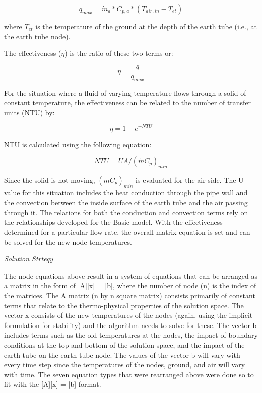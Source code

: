 \begin{equation}
q_{max} = \dot m_a * C_{p,a} * (T_{air,in} - T_{et})
\end{equation}

where \(T_{et}\) is the temperature of the ground at the depth of the earth tube (i.e., at the earth tube node).

The effectiveness (\(\eta\)) is the ratio of these two terms or:

\begin{equation}
\eta = \frac{q}{q_{max}}
\end{equation}

For the situation where a fluid of varying temperature flows through a solid of constant temperature, the effectiveness can be related to the number of transfer units (NTU) by:

\begin{equation}
\eta = 1 - e^{-NTU}
\end{equation}

NTU is calculated using the following equation:

\begin{equation}
NTU = U A / (\dot m C_p)_{min}
\end{equation}

Since the solid is not moving, \((\dot m C_p)_{min}\) is evaluated for the air side.  The U-value for this situation includes the heat conduction through the pipe wall and the convection between the inside surface of the earth tube and the air passing through it.  The relations for both the conduction and convection terms rely on the relationships developed for the Basic model.  With the effectiveness determined for a particular flow rate, the overall matrix equation is set and can be solved for the new node temperatures.

\emph{\textit{Solution Strtegy}}

The node equations above result in a system of equations that can be arranged as a matrix in the form of [A][x] = [b], where the number of node (n) is the index of the matrices.  The A matrix (n by n square matrix) consists primarily of constant terms that relate to the thermo-physical properties of the solution space.  The vector x consists of the new temperatures of the nodes (again, using the implicit formulation for stability) and the algorithm needs to solve for these.  The vector b includes terms such as the old temperatures at the nodes, the impact of boundary conditions at the top and bottom of the solution space, and the impact of the earth tube on the earth tube node.  The values of the vector b will vary with every time step since the temperatures of the nodes, ground, and air will vary with time.  The seven equation types that were rearranged above were done so to fit with the [A][x] = [b] format.


